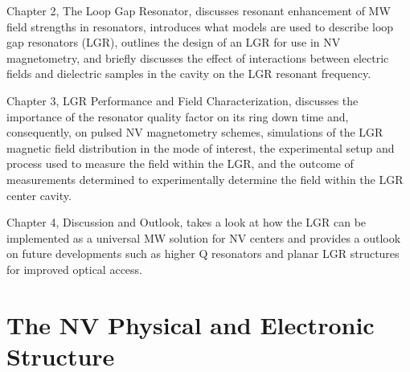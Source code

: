Chapter 2, The Loop Gap Resonator, discusses resonant enhancement of MW field strengths in resonators, introduces what models are used to describe loop gap resonators (LGR), outlines the design of an LGR for use in NV magnetometry, and briefly discusses the effect of interactions between electric fields and dielectric samples in the cavity on the LGR resonant frequency.


Chapter 3, LGR Performance and Field Characterization, discusses the importance of the resonator quality factor on its ring down time and, consequently, on pulsed NV magnetometry schemes, simulations of the LGR magnetic field distribution in the mode of interest, the experimental setup and process used to measure the field within the LGR, and the outcome of measurements determined to experimentally determine the field within the LGR center cavity.  

Chapter 4, Discussion and Outlook, takes a look at how the LGR can be implemented as a universal MW solution for NV centers and   provides a outlook on future developments such as higher Q resonators and planar LGR structures for improved optical access.


\section{The NV Physical and Electronic Structure} \label{sec:NVP}


